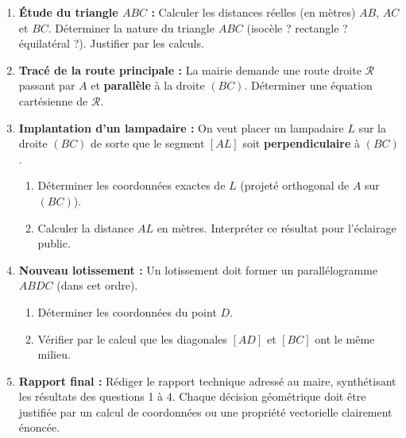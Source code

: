 \documentclass[11pt]{article}
\begin{document}
\begin{enumerate}
    \item \textbf{Étude du triangle $ABC$ :} Calculer les distances réelles (en mètres) $AB$, $AC$ et $BC$. Déterminer la nature du triangle $ABC$ (isocèle ? rectangle ? équilatéral ?). Justifier par les calculs.
    \item \textbf{Tracé de la route principale :} La mairie demande une route droite $\mathcal{R}$ passant par $A$ et \textbf{parallèle} à la droite $(BC)$. Déterminer une équation cartésienne de $\mathcal{R}$.
    \item \textbf{Implantation d'un lampadaire :} On veut placer un lampadaire $L$ sur la droite $(BC)$ de sorte que le segment $[AL]$ soit \textbf{perpendiculaire} à $(BC)$. 
    \begin{enumerate}
        \item Déterminer les coordonnées exactes de $L$ (projeté orthogonal de $A$ sur $(BC)$).
        \item Calculer la distance $AL$ en mètres. Interpréter ce résultat pour l'éclairage public.
    \end{enumerate}
    \item \textbf{Nouveau lotissement :} Un lotissement doit former un parallélogramme $ABDC$ (dans cet ordre). 
    \begin{enumerate}
        \item Déterminer les coordonnées du point $D$.
        \item Vérifier par le calcul que les diagonales $[AD]$ et $[BC]$ ont le même milieu.
    \end{enumerate}
    \item \textbf{Rapport final :} Rédiger le rapport technique adressé au maire, synthétisant les résultats des questions 1 à 4. Chaque décision géométrique doit être justifiée par un calcul de coordonnées ou une propriété vectorielle clairement énoncée.
\end{enumerate}
\end{document}
